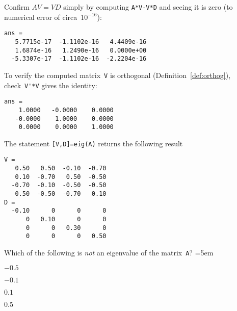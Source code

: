 \begin{example}
\begin{solution}
\begin{itemize}
\end{itemize}
Confirm \(AV=VD\) simply by computing \verb|A*V-V*D| and seeing it is zero (to numerical error of circa~\(10^{-16}\)):
\begin{verbatim}
ans =
   5.7715e-17  -1.1102e-16   4.4409e-16
   1.6874e-16   1.2490e-16   0.0000e+00
  -5.3307e-17  -1.1102e-16  -2.2204e-16
\end{verbatim}
To verify the computed matrix~\verb|V| is orthogonal (Definition~\ref{def:orthog}), check~\verb|V'*V| gives the identity:
\begin{verbatim}
ans =
    1.0000   -0.0000    0.0000
   -0.0000    1.0000    0.0000
    0.0000    0.0000    1.0000
\end{verbatim}
\end{solution}
\end{example}




\begin{activity}
The statement \verb|[V,D]=eig(A)| returns the following result \twodp
\begin{verbatim}
V =
   0.50   0.50  -0.10  -0.70
   0.10  -0.70   0.50  -0.50
  -0.70  -0.10  -0.50  -0.50
   0.50  -0.50  -0.70   0.10
D =
  -0.10      0      0      0
      0   0.10      0      0
      0      0   0.30      0
      0      0      0   0.50
\end{verbatim}
Which of the following is \emph{not} an eigenvalue of the matrix~\verb|A|?
\partswidth=5em
\begin{parts}
\item \(-0.5\)\actans
\item \(-0.1\)
\item \(0.1\)
\item \(0.5\)
\end{parts}
\end{activity}





